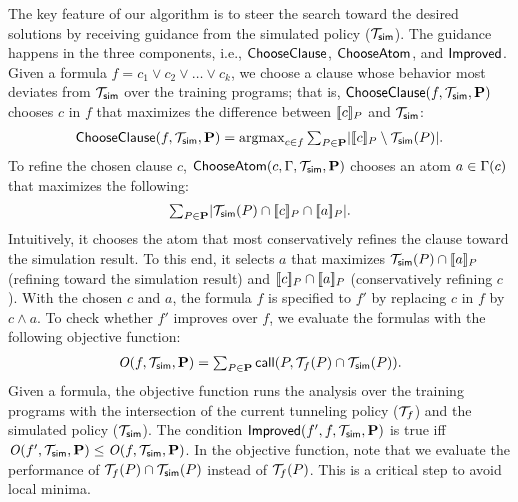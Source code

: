 The key feature of our algorithm is to steer the search toward the
desired solutions by receiving guidance from the
simulated policy ($\mathcal{T}_{{\sf sim}}$). 
The guidance happens in the three components, 
i.e., ${\sf ChooseClause}$, ${\sf ChooseAtom}$, and ${\sf Improved}$. 
Given a formula
$f = c_1 \vee c_2 \vee \dots \vee c_k$, we choose a clause whose
behavior most deviates from $\mathcal{T}_{{\sf sim}}$ over the training
programs; that is, ${\sf ChooseClause}(f, \mathcal{T}_{{\sf sim}}, \mathbf{P})$ chooses $c$ in $f$ that
maximizes the difference between $[\![c]\!]_P$ and $\mathcal{T}_{{\sf sim}}$:
\[
  \begin{array}{c}
\ChooseClause(f, \simheuristic, \vec{P}) = \argmax_{c \in f} \sum_{P \in \vec{P}} \lvert
    \featmean{c}{P} \setminus \simheuristic(P)\rvert.
    \end{array}
\]
To refine the chosen clause $c$, 
${\sf ChooseAtom}(c, \Gamma, \mathcal{T}_{{\sf sim}}, \mathbf{P})$ chooses an atom $a \in \Gamma(c)$
that maximizes the following: 
\[
  \begin{array}{c}
\sum_{P \in \mathbf{P}}  \lvert \mathcal{T}_{{\sf sim}}(P) \cap [\![c]\!]_{P} \cap [\![a]\!]_{P}  \rvert.
  \end{array}
\]
Intuitively, it chooses the atom that most conservatively refines the clause toward
the simulation result. To this end, it selects $a$ that maximizes
$\mathcal{T}_{{\sf sim}}(P) \cap [\![a]\!]_{P}$ (refining toward the simulation result) and
$[\![c]\!]_P \cap [\![a]\!]_P$ (conservatively refining $c$).
With the chosen $c$ and $a$, the formula $f$ is specified to $f'$
by replacing $c$ in $f$ by $c \land a$. To check whether $f'$ improves
over $f$, we evaluate the formulas with the following objective function:
\[
    \begin{array}{c}
{\it O}(f,\mathcal{T}_{{\sf sim}},\mathbf{P}) = \sum_{P\in\mathbf{P}} {\sf call}(P, \mathcal{T}_f(P) \cap
      \mathcal{T}_{{\sf sim}}(P)).
      \end{array}
\]
Given a formula, the objective function runs the analysis over the
training programs with the intersection of the current tunneling policy
($\mathcal{T}_f$) and the simulated policy ($\mathcal{T}_{{\sf sim}}$). 
The condition ${\sf Improved}(f', f,\mathcal{T}_{{\sf sim}},\mathbf{P})$ is true iff ${\it O}(f',\mathcal{T}_{{\sf sim}},\mathbf{P}) \le {\it O}(f,\mathcal{T}_{{\sf sim}},\mathbf{P})$. 
In the objective function, note that we evaluate the performance of
$\mathcal{T}_{f}(P) \cap \mathcal{T}_{{\sf sim}}(P)$ instead of
$\mathcal{T}_{f}(P)$. This is a critical step to avoid local minima.

